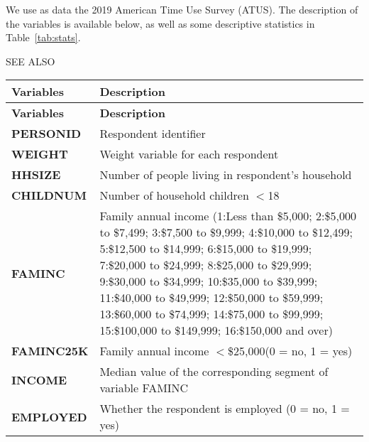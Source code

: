 \documentclass[12pt,a4paper]{article}
\begin{document}
We use as data the 2019 American Time Use Survey (ATUS). The description of the variables is available below,
as well as some descriptive statistics in Table~\vref{tab:stats}.

SEE ALSO 

\begin{longtable}{|p{}|p{}|}
  \hline
  \textbf{Variables} & \textbf{Description} \\
  \hline
  \endfirsthead

  \hline
   \textbf{Variables} & \textbf{Description} \\
  \hline
  \endhead

  \hline
  \endfoot

  \hline
  \endlastfoot

\textbf{PERSONID} &

Respondent identifier\\

\textbf{WEIGHT} &

Weight variable for each respondent \\

\textbf{HHSIZE} &

Number of people living in respondent's household \\

\textbf{CHILDNUM} &

Number of household children $<$18 \\

\textbf{FAMINC} &

Family annual income (1:Less than \$5,000; 2:\$5,000 to \$7,499; 3:\$7,500 to \$9,999; 4:\$10,000 to \$12,499;
  5:\$12,500 to \$14,999; 6:\$15,000 to \$19,999; 7:\$20,000 to \$24,999; 8:\$25,000 to \$29,999; 9:\$30,000
  to \$34,999; 10:\$35,000 to \$39,999; 11:\$40,000 to \$49,999; 12:\$50,000 to \$59,999; 13:\$60,000 to
  \$74,999; 14:\$75,000 to \$99,999; 15:\$100,000 to \$149,999; 16:\$150,000 and over) \\

\textbf{FAMINC25K} &

Family annual income $<$\$25,000(0 = no, 1 = yes) \\

\textbf{INCOME} &

Median value of the corresponding segment of variable FAMINC \\

\textbf{EMPLOYED} &

Whether the respondent is employed (0 = no, 1 = yes) \\


\end{longtable}
\end{document}
